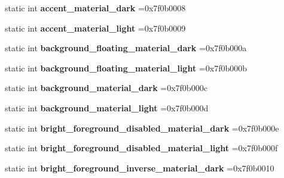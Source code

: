 \begin{DoxyCompactItemize}
static int {\bfseries accent\+\_\+material\+\_\+dark} =0x7f0b0008
\item 
\mbox{\label{classandroid_1_1support_1_1v4_1_1R_1_1color_acdedeb66c4ba4c4d5757413fc5e3d8e0}} 
static int {\bfseries accent\+\_\+material\+\_\+light} =0x7f0b0009
\item 
\mbox{\label{classandroid_1_1support_1_1v4_1_1R_1_1color_a9b4d785d0f1a57c58ba0a3c63cd75e0a}} 
static int {\bfseries background\+\_\+floating\+\_\+material\+\_\+dark} =0x7f0b000a
\item 
\mbox{\label{classandroid_1_1support_1_1v4_1_1R_1_1color_adc331a9d48b6b0f27618725c27317155}} 
static int {\bfseries background\+\_\+floating\+\_\+material\+\_\+light} =0x7f0b000b
\item 
\mbox{\label{classandroid_1_1support_1_1v4_1_1R_1_1color_a69ec97d1223f9b63ff8e87787258af96}} 
static int {\bfseries background\+\_\+material\+\_\+dark} =0x7f0b000c
\item 
\mbox{\label{classandroid_1_1support_1_1v4_1_1R_1_1color_a78f9859f617b8da8d78def977254d664}} 
static int {\bfseries background\+\_\+material\+\_\+light} =0x7f0b000d
\item 
\mbox{\label{classandroid_1_1support_1_1v4_1_1R_1_1color_ae947ea723fcb5532a4c0cfcff3249e48}} 
static int {\bfseries bright\+\_\+foreground\+\_\+disabled\+\_\+material\+\_\+dark} =0x7f0b000e
\item 
\mbox{\label{classandroid_1_1support_1_1v4_1_1R_1_1color_a66224aa21d582c6797d455ddb33ee250}} 
static int {\bfseries bright\+\_\+foreground\+\_\+disabled\+\_\+material\+\_\+light} =0x7f0b000f
\item 
\mbox{\label{classandroid_1_1support_1_1v4_1_1R_1_1color_ab98e37644046423efe105d7c386eebd8}} 
static int {\bfseries bright\+\_\+foreground\+\_\+inverse\+\_\+material\+\_\+dark} =0x7f0b0010
\item 

\end{DoxyCompactItemize}
